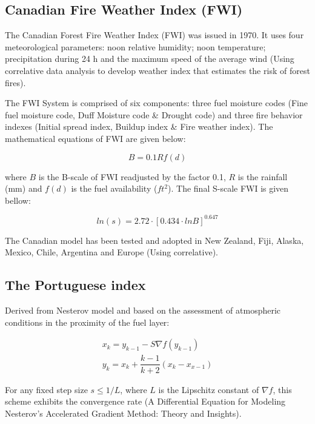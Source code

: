 {{{\subsection{Canadian Fire Weather Index (FWI)}
	The Canadian Forest Fire Weather Index (FWI) was issued in 1970. It uses four meteorological parameters: noon relative humidity; noon temperature; precipitation during 24 h and the maximum speed of the average wind (Using correlative data analysis to develop weather index that estimates the risk of forest fires).
	
	The FWI System is comprised of six components: three fuel moisture codes (Fine fuel moisture code, Duff Moisture code \& Drought code) and three fire behavior indexes (Initial spread index, Buildup index \& Fire weather index). The mathematical equations of FWI are given below:
	
	\begin{equation}
	B=0.1Rf(d)
	\end{equation}
	
	where $B$ is the B-scale of FWI readjusted by the factor 0.1, $R$ is the rainfall (mm) and $f(d)$ is the fuel availability ($ft^2$). The final
	S-scale FWI is given bellow:

	\begin{equation}
	ln(s)=2.72 \cdot [0.434 \cdot lnB]^{0.647}
	\end{equation}
	
	The Canadian model has been tested and adopted in New Zealand, Fiji, Alaska, Mexico, Chile, Argentina and Europe (Using correlative).
	
	\subsection{The Portuguese index}
		Derived from Nesterov model and based on the assessment of atmospheric conditions in the proximity of the fuel layer:
		
	\begin{equation}
		\begin{aligned}
			x_{k} = y_{k-1} - S\nabla f(y_{k-1})\\
			y_{k} = x_{k} + \dfrac{k-1}{k+2}(x_{k} - x_{x-1})
		\end{aligned}
	\end{equation}

	For any fixed step size $s \le 1/L$, where $L$ is the Lipschitz constant of $\nabla f$, this scheme exhibits the convergence rate (A Differential Equation for Modeling Nesterov’s Accelerated Gradient Method: Theory and Insights).
	
}}}
